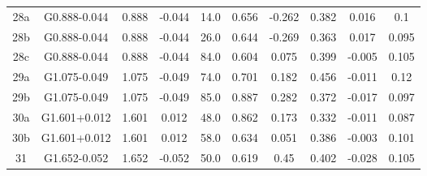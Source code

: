 \begin{table}
\begin{tabular}{cccccccccc}
28a & G0.888-0.044 & 0.888 & -0.044 & 14.0 & 0.656 & -0.262 & 0.382 & 0.016 & 0.1 \\
28b & G0.888-0.044 & 0.888 & -0.044 & 26.0 & 0.644 & -0.269 & 0.363 & 0.017 & 0.095 \\
28c & G0.888-0.044 & 0.888 & -0.044 & 84.0 & 0.604 & 0.075 & 0.399 & -0.005 & 0.105 \\
29a & G1.075-0.049 & 1.075 & -0.049 & 74.0 & 0.701 & 0.182 & 0.456 & -0.011 & 0.12 \\
29b & G1.075-0.049 & 1.075 & -0.049 & 85.0 & 0.887 & 0.282 & 0.372 & -0.017 & 0.097 \\
30a & G1.601+0.012 & 1.601 & 0.012 & 48.0 & 0.862 & 0.173 & 0.332 & -0.011 & 0.087 \\
30b & G1.601+0.012 & 1.601 & 0.012 & 58.0 & 0.634 & 0.051 & 0.386 & -0.003 & 0.101 \\
31 & G1.652-0.052 & 1.652 & -0.052 & 50.0 & 0.619 & 0.45 & 0.402 & -0.028 & 0.105 \\
\end{tabular}
\end{table}
